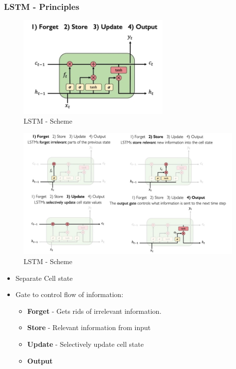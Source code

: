 \documentclass[12pt]{report}
\begin{document}
\subsubsection{LSTM - Principles}


\begin{figure}[H]\centering\includegraphics[width=7.5cm]{LSTM_MAIN.jpeg}\caption{LSTM - Scheme}\end{figure}

\begin{figure}[H]\centering\includegraphics[width=14cm]{LSTM_SCHEME.jpeg}\caption{LSTM - Scheme}\end{figure}

\begin{itemize}
	\item Separate Cell state
	\item Gate to control flow of information:
	\begin{itemize}
		\item \textbf{Forget} - Gets rids of irrelevant information.
		\item \textbf{Store} - Relevant information from input
		\item \textbf{Update} - Selectively update cell state
		\item \textbf{Output}
	\end{itemize}
\end{itemize}
\end{document}
